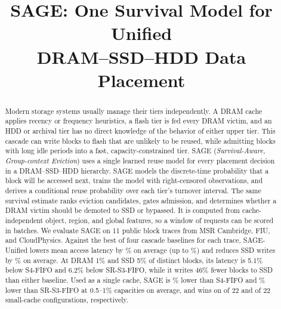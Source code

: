 \documentclass[conference]{IEEEtran}
\begin{document}
\title{SAGE: One Survival Model for Unified\\DRAM--SSD--HDD Data Placement}

\author{
\and
{}
}

\maketitle

\begin{abstract}
Modern storage systems usually manage their tiers independently. A DRAM cache applies recency or frequency heuristics, a flash tier is fed every DRAM victim, and an HDD or archival tier has no direct knowledge of the behavior of either upper tier. This cascade can write blocks to flash that are unlikely to be reused, while admitting blocks with long idle periods into a fast, capacity-constrained tier. SAGE (\emph{Survival-Aware, Group-context Eviction}) uses a single learned reuse model for every placement decision in a DRAM--SSD--HDD hierarchy.
SAGE models the discrete-time probability that a block will be accessed next, trains the model with right-censored observations, and derives a conditional reuse probability over each tier's turnover interval. The same survival estimate ranks eviction candidates, gates admission, and determines whether a DRAM victim should be demoted to SSD or bypassed. It is computed from cache-independent object, region, and global features, so a window of requests can be scored in batches.
We evaluate SAGE on 11 public block traces from MSR Cambridge, FIU, and CloudPhysics. Against the best of four cascade baselines for each trace, SAGE-Unified lowers mean access latency by \tierLatRedBest\% on average (up to \tierLatRedMax\%) and reduces SSD writes by \tierWrRedBest\% on average. At DRAM 1\% and SSD 5\% of distinct blocks, its latency is 5.1\% below S4-FIFO and 6.2\% below SR-S3-FIFO, while it writes 46\% fewer blocks to SSD than either baseline. Used as a single cache, SAGE is \redSmallSFourFIFO\% lower than S4-FIFO and \redSmallSRSThreeFIFO\% lower than SR-S3-FIFO at 0.5--1\% capacities on average, and wins on \winSmallSFourFIFO{} of 22 and \winSmallSRSThreeFIFO{} of 22 small-cache configurations, respectively.
\end{abstract}
\end{document}

